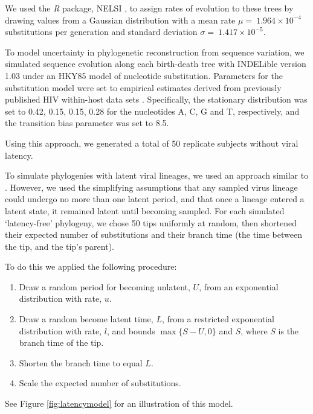 \documentclass[12pt]{article}
\begin{document}
We used the \textit{R} package, NELSI \citep{NELSI}, to assign rates of evolution to these trees by drawing values from a Gaussian distribution with a mean rate $\mu = \ 1.964\times 10^{-4}$ substitutions per generation and standard deviation $\sigma = \ 1.417\times 10^{-5}$. %

To model uncertainty in phylogenetic reconstruction from sequence variation, we simulated sequence evolution along each birth-death tree with INDELible version 1.03 \citep{Indelible09} under an HKY85 \citep{HKY85} model of nucleotide substitution.
Parameters for the substitution model were set to empirical estimates derived from previously published HIV within-host data sets \citep{McCloskey14}. 
Specifically, the stationary distribution was set to 0.42, 0.15, 0.15, 0.28 for the nucleotides A, C, G and T, respectively, and the transition bias parameter was set to 8.5.

Using this approach, we generated a total of 50 replicate subjects without viral latency. 


To simulate phylogenies with latent viral lineages, we used an approach similar to  \citet{Immonen14}. 
However, we used the simplifying assumptions that any sampled virus lineage could undergo no more than one latent period, and that once a lineage entered a latent state, it remained latent until becoming sampled.
For each simulated `latency-free' phylogeny, we chose 50 tips uniformly at random, then shortened their expected number of substitutions and their branch time (the time between the tip, and the tip's parent).

To do this we applied the following procedure:
\begin{enumerate}
\item Draw a random period for becoming unlatent, $U$, from an exponential distribution with rate, $u$.
\item Draw a random become latent time, $L$, from a restricted exponential distribution with rate, $l$, and bounds $\max\{S-U, 0\}$ and $S$, where $S$ is the branch time of the tip.
\item Shorten the branch time to equal $L$.
\item Scale the expected number of substitutions.
\end{enumerate}
See Figure \ref{fig:latencymodel} for an illustration of this model.
\end{document}
